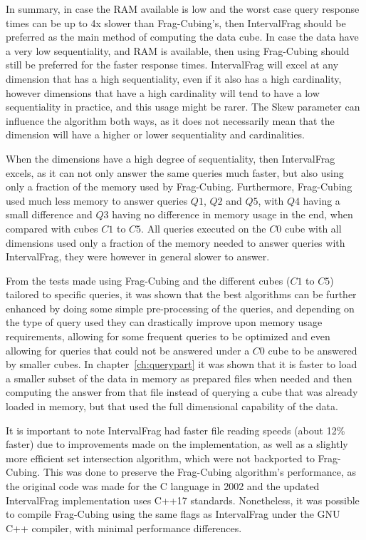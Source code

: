 In summary, in case the RAM available is low and the worst case query response times can be up to 4x slower than Frag-Cubing's, then IntervalFrag should be preferred as the main method of computing the data cube.
In case the data have a very low sequentiality, and RAM is available, then using Frag-Cubing should still be preferred for the faster response times.
IntervalFrag will excel at any dimension that has a high sequentiality, even if it also has a high cardinality, however dimensions that have a high cardinality will tend to have a low sequentiality in practice, and this usage might be rarer.
The Skew parameter can influence the algorithm both ways, as it does not necessarily mean that the dimension will have a higher or lower sequentiality and cardinalities.

When the dimensions have a high degree of sequentiality, then IntervalFrag excels, as it can not only answer the same queries much faster, but also using only a fraction of the memory used by Frag-Cubing.
Furthermore, Frag-Cubing used much less memory to answer queries $Q1$, $Q2$ and $Q5$, with $Q4$ having a small difference and $Q3$ having no difference in memory usage in the end, when compared with cubes $C1$ to $C5$.
All queries executed on the $C0$ cube with all dimensions used only a fraction of the memory needed to answer queries with IntervalFrag, they were however in general slower to answer.

From the tests made using Frag-Cubing and the different cubes ($C1$ to $C5$) tailored to specific queries, it was shown that the best algorithms can be further enhanced by doing some simple pre-processing of the queries, and depending on the type of query used they can drastically improve upon memory usage requirements, allowing for some frequent queries to be optimized and even allowing for queries that could not be answered under a $C0$ cube to be answered by smaller cubes.
In chapter~\ref{ch:querypart} it was shown that it is faster to load a smaller subset of the data in memory as prepared files when needed and then computing the answer from that file instead of querying a cube that was already loaded in memory, but that used the full dimensional capability of the data.

It is important to note IntervalFrag had faster file reading speeds (about 12\% faster) due to improvements made on the implementation, as well as a slightly more efficient set intersection algorithm, which were not backported to Frag-Cubing.
This was done to preserve the Frag-Cubing algorithm's performance, as the original code was made for the C language in 2002 and the updated IntervalFrag implementation uses C++17 standards.
Nonetheless, it was possible to compile Frag-Cubing using the same flags as IntervalFrag under the GNU C++ compiler, with minimal performance differences.

